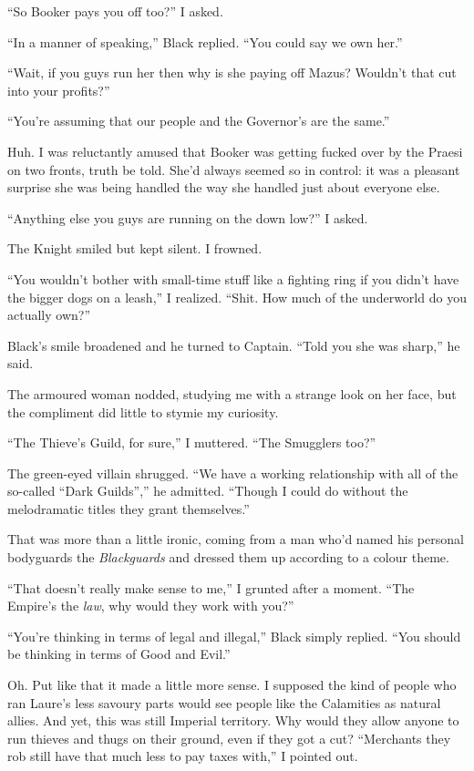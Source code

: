 \documentclass[12pt, openany]{book}
\begin{document}
“So Booker pays you off too?” I asked.

“In a manner of speaking,” Black replied. “You could say we own her.”

“Wait, if you guys run her then why is she paying off Mazus? Wouldn’t that cut into your profits?”

“You’re assuming that our people and the Governor’s are the same.”

Huh. I was reluctantly amused that Booker was getting fucked over by the Praesi on two fronts, truth be told. She’d always seemed so in control: it was a pleasant surprise she was being handled the way she handled just about everyone else.

“Anything else you guys are running on the down low?” I asked.

The Knight smiled but kept silent. I frowned.

“You wouldn’t bother with small-time stuff like a fighting ring if you didn’t have the bigger dogs on a leash,” I realized. “Shit. How much of the underworld do you actually own?”

Black’s smile broadened and he turned to Captain. “Told you she was sharp,” he said.

The armoured woman nodded, studying me with a strange look on her face, but the compliment did little to stymie my curiosity.

“The Thieve’s Guild, for sure,” I muttered. “The Smugglers too?”

The green-eyed villain shrugged. “We have a working relationship with all of the so-called “Dark Guilds”,” he admitted. “Though I could do without the melodramatic titles they grant themselves.”

That was more than a little ironic, coming from a man who’d named his personal bodyguards the \textit{Blackguards }and dressed them up according to a colour theme.

“That doesn’t really make sense to me,” I grunted after a moment. “The Empire’s the \textit{law}, why would they work with you?”

“You’re thinking in terms of legal and illegal,” Black simply replied. “You should be thinking in terms of Good and Evil.”

Oh. Put like that it made a little more sense. I supposed the kind of people who ran Laure’s less savoury parts would see people like the Calamities as natural allies. And yet, this was still Imperial territory. Why would they allow anyone to run thieves and thugs on their ground, even if they got a cut? “Merchants they rob still have that much less to pay taxes with,” I pointed out.
\end{document}
